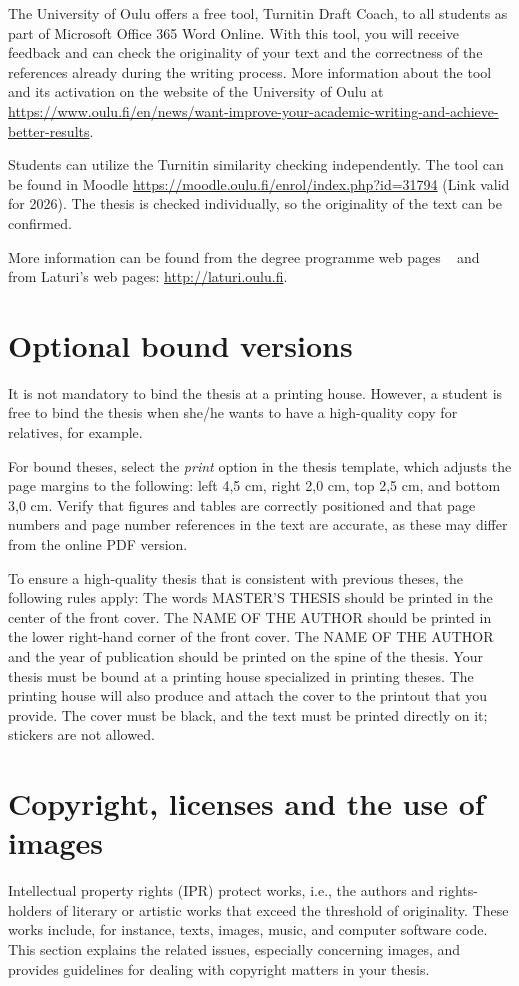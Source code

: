 The University of Oulu offers a free tool, Turnitin Draft Coach, to
all students as part of Microsoft Office 365 Word Online. With this
tool, you will receive feedback and can check the originality of your
text and the correctness of the references already during the writing
process.  More information about the tool and its activation on the
website of the University of Oulu at
\url{https://www.oulu.fi/en/news/want-improve-your-academic-writing-and-achieve-better-results}.

Students can utilize the Turnitin similarity checking independently.
The tool can be found in Moodle \url{https://moodle.oulu.fi/enrol/index.php?id=31794} (Link valid for 2026). The thesis is checked individually, so the originality of the text can be confirmed.

More information can be found from the degree programme web pages
~\cite{mscstudies} and from Laturi’s web pages: \url{http://laturi.oulu.fi}.

\section{Optional bound versions}
\label{boundversion}
It is not mandatory to bind the thesis at a printing house. However, a
student is free to bind the thesis when she/he wants to have a
high-quality copy for relatives, for example.

For bound theses, select the \textit{print} option in the thesis
template, which adjusts the page margins to the following: left 4,5
cm, right 2,0 cm, top 2,5 cm, and bottom 3,0 cm. Verify that figures
and tables are correctly positioned and that page numbers and page
number references in the text are accurate, as these may differ from
the online PDF version. 

To ensure a high-quality thesis that is consistent with previous
theses, the following rules apply: The words MASTER’S THESIS should be
printed in the center of the front cover. The NAME OF THE AUTHOR
should be printed in the lower right-hand corner of the front
cover. The NAME OF THE AUTHOR and the year of publication should be
printed on the spine of the thesis. Your thesis must be bound at a
printing house specialized in printing theses. The printing house will
also produce and attach the cover to the printout that you
provide. The cover must be black, and the text must be printed
directly on it; stickers are not allowed.

\section{Copyright, licenses and the use of images}
\label{copyright}
Intellectual property rights (IPR) protect works, i.e., the authors
and rights-holders of literary or artistic works that exceed the
threshold of originality. These works include, for instance, texts,
images, music, and computer software code. This section explains the
related issues, especially concerning images, and provides guidelines
for dealing with copyright matters in your thesis.


